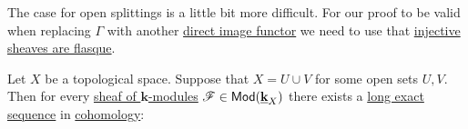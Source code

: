 \documentclass[../../main]{subfiles}
\begin{document}
The case for open splittings is a little bit more difficult.
For our proof to be valid when replacing \(\Gamma\) with another \hyperref[def:direct-image-sheaf]{direct image functor} we need to use that \hyperref[lemma:injective-sheaves-are-flasque]{injective sheaves are flasque}.
\begin{theorem}\label{thm:mayer-vietoris-open}
  Let \(X\) be a topological space.
  Suppose that \(X = U \cup V\) for some open sets \(U, V\).
  Then for every \hyperref[def:sheaf]{sheaf of \(\mathbf{k}\)-modules} \(\mathscr{F} \in \mathsf{Mod}(\underline{\mathbf{k}}_{X})\) there exists a \hyperref[def:exact-sequence]{long exact sequence} in \hyperref[def:cohomology]{cohomology}:
  \begin{center}
  \end{center}
\end{theorem}
\end{document}
